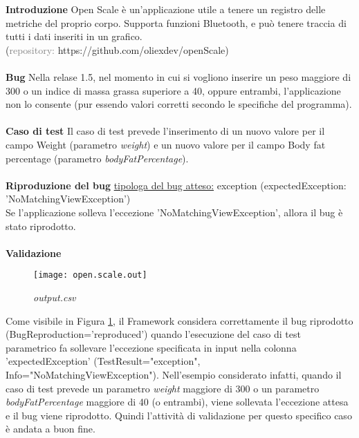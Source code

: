 \noindent\textbf{Introduzione}\newline
Open Scale è un’applicazione utile a tenere un registro delle metriche del proprio corpo. Supporta funzioni Bluetooth, e può tenere traccia di tutti i dati inseriti in un grafico.\\ (\textcolor{gray}{repository: }https://github.com/oliexdev/openScale)
\\\\
\noindent\textbf{Bug}\newline
Nella relase 1.5, nel momento in cui si vogliono inserire un peso maggiore di 300 o un indice di massa grassa superiore a 40, oppure entrambi, l’applicazione non lo consente (pur essendo valori corretti secondo le specifiche del programma).
\\\\
\noindent\textbf{Caso di test}\newline
Il caso di test prevede l'inserimento di un nuovo  valore per il campo Weight (parametro \emph{weight}) e un nuovo valore per il campo Body fat percentage (parametro \emph{bodyFatPercentage}).
\\\\

\noindent\textbf{Riproduzione del bug}\newline
\noindent\ul{tipologa del bug atteso:} exception (expectedException: 'NoMatchingViewException')\\
\noindent Se l'applicazione solleva l'eccezione 'NoMatchingViewException', allora il bug è stato riprodotto.
\\\\
\noindent\textbf{Validazione}
 \begin{figure}[H]
	\texttt{[image: open.scale.out]}
	\centering
		\caption{\emph{output.csv}}
    \label{fig:open.scale}
\end{figure}
\noindent Come visibile in Figura \ref{fig:open.scale}, il Framework considera correttamente il bug riprodotto  (BugReproduction='reproduced') quando l'esecuzione del caso di test parametrico fa sollevare l'eccezione specificata in input nella colonna 'expectedException' (TestResult="exception", Info="NoMatchingViewException"). Nell'esempio considerato infatti, quando il caso di test prevede un parametro \emph{weight} maggiore di 300 o un parametro \emph{bodyFatPercentage} maggiore di 40 (o entrambi), viene sollevata l'eccezione attesa e il bug viene riprodotto. Quindi l'attività di validazione per questo specifico caso è andata a buon fine.
